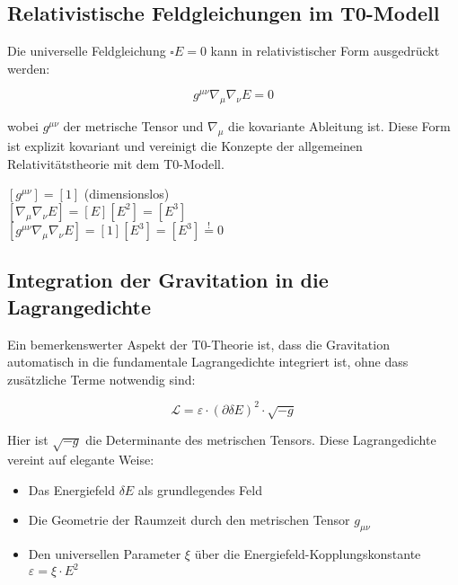 \documentclass[12pt,a4paper]{article}
\newcommand{\dfield}{\delta E}
\theoremstyle{definition}
\begin{document}
	\subsection{Relativistische Feldgleichungen im T0-Modell}
	
	Die universelle Feldgleichung $\square E = 0$ kann in relativistischer Form ausgedrückt werden:
	
	\begin{equation}
		\boxed{g^{\mu\nu}\nabla_\mu\nabla_\nu E = 0}
	\end{equation}
	
	wobei $g^{\mu\nu}$ der metrische Tensor und $\nabla_\mu$ die kovariante Ableitung ist. Diese Form ist explizit kovariant und vereinigt die Konzepte der allgemeinen Relativitätstheorie mit dem T0-Modell.
	
	\begin{einheitencheck}
		$[g^{\mu\nu}] = [1]$ (dimensionslos)\\
		$[\nabla_\mu\nabla_\nu E] = [E][E^2] = [E^3]$\\
		$[g^{\mu\nu}\nabla_\mu\nabla_\nu E] = [1][E^3] = [E^3] \stackrel{!}{=} 0$ \checkmark
	\end{einheitencheck}
	
	\subsection{Integration der Gravitation in die Lagrangedichte}
	
	Ein bemerkenswerter Aspekt der T0-Theorie ist, dass die Gravitation automatisch in die fundamentale Lagrangedichte integriert ist, ohne dass zusätzliche Terme notwendig sind:
	
	\begin{equation}
		\boxed{\mathcal{L} = \varepsilon \cdot (\partial\dfield)^2 \cdot \sqrt{-g}}
	\end{equation}
	
	Hier ist $\sqrt{-g}$ die Determinante des metrischen Tensors. Diese Lagrangedichte vereint auf elegante Weise:
	\begin{itemize}
		\item Das Energiefeld $\dfield$ als grundlegendes Feld
		\item Die Geometrie der Raumzeit durch den metrischen Tensor $g_{\mu\nu}$
		\item Den universellen Parameter $\xi$ über die Energiefeld-Kopplungskonstante $\varepsilon = \xi \cdot E^2$
	\end{itemize}
	
\end{document}
